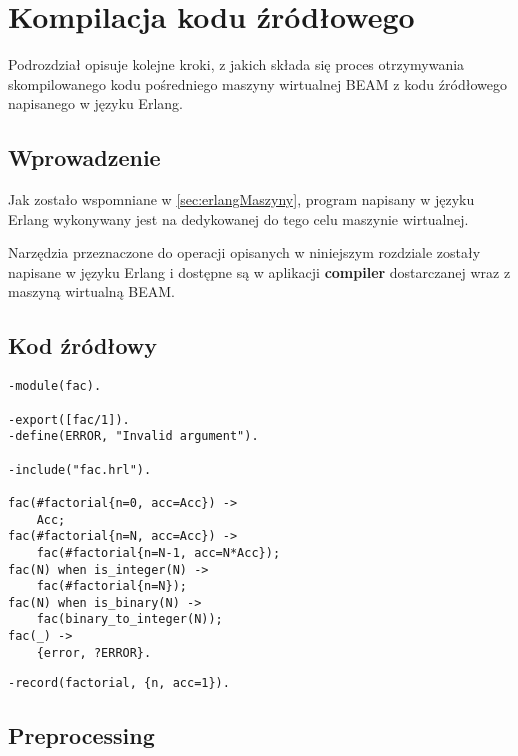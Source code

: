 \section{Kompilacja kodu źródłowego}
\label{sec:erlangKompilacja}

Podrozdział opisuje kolejne kroki, z jakich składa się proces otrzymywania skompilowanego kodu pośredniego maszyny wirtualnej BEAM z kodu źródłowego napisanego w języku Erlang.

\subsection{Wprowadzenie}

Jak zostało wspomniane w \ref{sec:erlangMaszyny}, program napisany w języku Erlang wykonywany jest na dedykowanej do tego celu maszynie wirtualnej.

Narzędzia przeznaczone do operacji opisanych w niniejszym rozdziale zostały napisane w języku Erlang i dostępne są w aplikacji \textbf{compiler} dostarczanej wraz z maszyną wirtualną BEAM.
\subsection{Kod źródłowy}

\begin{lstlisting}[style=erlang, caption=Plik fac.erl, label=facERL]
-module(fac).

-export([fac/1]).
-define(ERROR, "Invalid argument").

-include("fac.hrl").

fac(#factorial{n=0, acc=Acc}) ->
    Acc;
fac(#factorial{n=N, acc=Acc}) ->
    fac(#factorial{n=N-1, acc=N*Acc});
fac(N) when is_integer(N) ->
    fac(#factorial{n=N});
fac(N) when is_binary(N) ->
    fac(binary_to_integer(N));
fac(_) ->
    {error, ?ERROR}.
\end{lstlisting}

\begin{lstlisting}[style=erlang, caption=Plik fac.hrl, label=facHRL]
-record(factorial, {n, acc=1}).
\end{lstlisting}

\subsection{Preprocessing}

